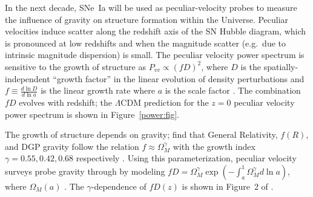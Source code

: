 \documentclass[11pt, oneside]{article}   	%
\begin{document}
In the next decade, SNe~Ia will be used as peculiar-velocity probes to measure  the influence of gravity on structure formation within the Universe.
Peculiar velocities induce scatter along the redshift axis of the SN Hubble diagram, which is
pronounced at low redshifts and when the magnitude scatter (e.g.\ due to intrinsic magnitude dispersion) is small.
The peculiar velocity power spectrum is sensitive to the growth of structure as $P_{vv}\propto (fD)^2$, where $D$ is  the spatially-independent
``growth factor'' in the linear evolution of density perturbations and
$f \equiv \frac{d\ln{D}}{d\ln{a}}$ is the linear growth rate where $a$ is the scale factor  \citep{2006PhRvD..73l3526H,2011ApJ...741...67D}.
The combination $fD$ evolves with redshift;
the $\Lambda$CDM prediction for the $z=0$ peculiar velocity power spectrum is shown in Figure~\ref{power:fig}.

The  growth of structure depends on gravity;
\citet{PhysRevD.72.043529,2007APh....28..481L} find that General Relativity, $f(R)$,  and DGP gravity follow the relation
$f \approx \Omega_M^\gamma$ with the growth index $\gamma=0.55, 0.42, 0.68$ respectively \citep[see][for a review
or these  models]{HUTERER201523}.  
Using this parameterization, peculiar velocity
surveys probe  gravity through by modeling $fD=\Omega_M^{\gamma} \exp{\left(-\int_a^1 \Omega_M^{\gamma} d\ln{a} \right)}$,
where $\Omega_M(a)$ .
The  $\gamma$-dependence of $fD(z)$ is shown 
in Figure~2 of  \citet{1475-7516-2013-04-031}.

%
\end{document}
